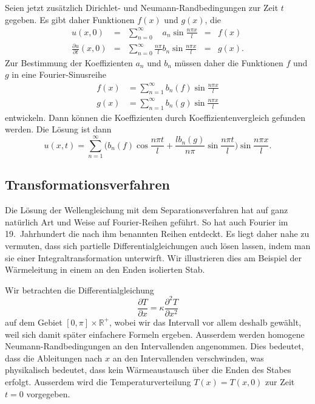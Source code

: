 Seien jetzt zusätzlich Dirichlet- und Neumann-Randbedingungen zur Zeit
$t$ gegeben.
Es gibt daher Funktionen $f(x)$ und $g(x)$, die
\[
\renewcommand{\arraycolsep}{2pt}
\begin{array}{rclcl}
u(x,0)
&=&
\displaystyle
\sum_{n=0}^\infty \phantom{\frac{n\pi}{l}}a_n \sin\frac{n\pi x}{l}
&=&
f(x) \\
\displaystyle
\frac{\partial u}{\partial t}(x,0)
&=&
\displaystyle
\sum_{n=0}^\infty \frac{n\pi}{l}b_n \sin\frac{n\pi x}{l}
&=&
g(x).
\end{array}
\]
Zur Bestimmung der Koeffizienten $a_n$ und $b_n$ müssen daher die
Funktionen $f$ und $g$ in eine Fourier-Sinusreihe
\begin{align*}
f(x) & = \sum_{n=1}^\infty b_n(f)\sin \frac{n\pi x}{l} \\
g(x) & = \sum_{n=1}^\infty b_n(g)\sin \frac{n\pi x}{l}
\end{align*}
entwickeln.
Dann können die Koeffizienten durch Koeffizientenvergleich gefunden
werden.
Die Lösung ist dann
\[
u(x,t)
=
\sum_{n=1}^\infty
\biggl(
b_n(f)
\cos\frac{n\pi t}{l}
+
\frac{lb_n(g)}{n\pi}
\sin\frac{n\pi t}{l}
\biggr)
\sin\frac{n\pi x}{l}.
\]

\subsection{Transformationsverfahren}
%
Die Lösung der Wellengleichung mit dem Separationsverfahren hat 
auf ganz natürlich Art und Weise auf Fourier-Reihen geführt.
So hat auch Fourier im 19.~Jahrhundert die nach ihm benannten
Reihen entdeckt.
Es liegt daher nahe zu vermuten, dass sich partielle Differentialgleichungen
auch lösen lassen, indem man sie einer Integraltransformation
unterwirft.
Wir illustrieren dies am Beispiel der Wärmeleitung in einem 
an den Enden isolierten Stab.

Wir betrachten die Differentialgleichung
\[
\frac{\partial T}{\partial x}
=
\kappa
\frac{\partial^2 T}{\partial x^2}
\]
auf dem Gebiet $[0,\pi]\times\mathbb{R}^+$, wobei wir das Intervall
vor allem deshalb gewählt, weil sich damit später einfachere Formeln
ergeben.
Ausserdem werden homogene Neumann-Randbedingungen an den
Intervallenden angenommen.
Dies bedeutet, dass die Ableitungen nach $x$ an den Intervallenden
verschwinden, was physikalisch bedeutet, dass kein Wärmeaustausch
über die Enden des Stabes erfolgt.
Ausserdem wird die Temperaturverteilung $T(x)=T(x,0)$ zur Zeit $t=0$
vorgegeben.

